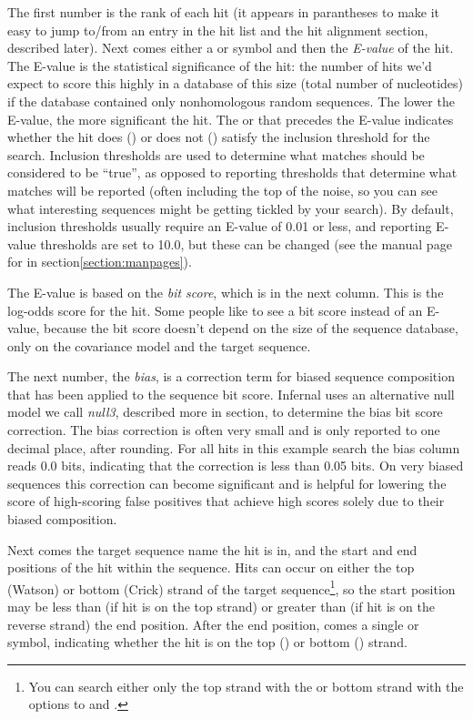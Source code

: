 The first number is the rank of each hit (it appears in parantheses to
make it easy to jump to/from an entry in the hit list and the hit
alignment section, described later). Next comes either a \ccode{!} or
 symbol and then the \emph{E-value} of the hit.  The E-value
is the statistical significance of the hit: the number of hits we'd
expect to score this highly in a database of this size (total number
of nucleotides) if the database contained only nonhomologous random
sequences. The lower the E-value, the more significant the hit.  The
\ccode{!} or  that precedes the E-value indicates whether the
hit does (\ccode{!}) or does not () satisfy the inclusion
threshold for the search.  Inclusion thresholds are used to determine
what matches should be considered to be ``true'', as opposed to
reporting thresholds that determine what matches will be reported
(often including the top of the noise, so you can see what interesting
sequences might be getting tickled by your search). By default,
inclusion thresholds usually require an E-value of 0.01 or less, and
reporting E-value thresholds are set to 10.0, but these can be changed
(see the manual page for  in
section\ref{section:manpages}).

The E-value is based on the \emph{bit score}, which is in the next
column. This is the log-odds score for the hit. Some people like to
see a bit score instead of an E-value, because the bit score doesn't
depend on the size of the sequence database, only on the covariance
model and the target sequence.

The next number, the \emph{bias}, is a correction term for biased
sequence composition that has been applied to the sequence bit
score. Infernal uses an alternative null model we call \emph{null3},
described more in section\label{section:null3}, to determine the bias
bit score correction. The bias correction is often very small and is
only reported to one decimal place, after rounding. For all hits in
this example search the bias column reads 0.0 bits, indicating that
the correction is less than 0.05 bits. On very biased sequences this
correction can become significant and is helpful for lowering the
score of high-scoring false positives that achieve high scores solely
due to their biased composition. 

Next comes the target sequence name the hit is in, and the start and
end positions of the hit within the sequence. Hits can occur on either
the top (Watson) or bottom (Crick) strand of the target
sequence\footnote{You can search either only the top strand with the
 or bottom strand with the  options
to  and .}, so the start position may be
less than (if hit is on the top strand) or greater than (if hit is on
the reverse strand) the end position. After the end position, comes a single
\ccode{+} or \ccode{-} symbol, indicating whether the hit is on the
top (\ccode{+}) or bottom (\ccode{-}) strand.

